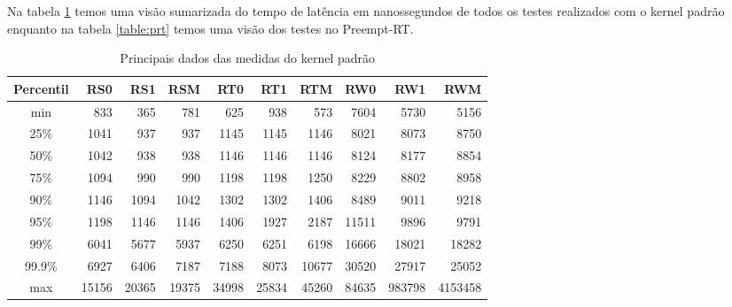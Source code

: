 Na tabela \ref{table:rpi} temos uma visão sumarizada do tempo de latência em nanossegundos de todos os testes realizados com o kernel padrão enquanto na tabela \ref{table:prt} temos uma visão dos testes no Preempt-RT.

\begin{table}[!htb]
\centering
\begin{center}
\begin{tabular}{|c|r|r|r|r|r|r|r|r|r|}
\toprule
Percentil &    RS0 &     RS1 &    RSM &    RT0 &    RT1 &    RTM &    RW0 &     RW1 &      RWM \\
\midrule
    min &    833 &    365 &    781 &    625 &    938 &    573 &   7604 &    5730 &     5156 \\
    25\% &   1041 &    937 &    937 &   1145 &   1145 &   1146 &   8021 &    8073 &     8750 \\
    50\% &   1042 &    938 &    938 &   1146 &   1146 &   1146 &   8124 &    8177 &     8854 \\
    75\% &   1094 &    990 &    990 &   1198 &   1198 &   1250 &   8229 &    8802 &     8958 \\
    90\% &   1146 &   1094 &   1042 &   1302 &   1302 &   1406 &   8489 &    9011 &     9218 \\
    95\% &   1198 &   1146 &   1146 &   1406 &   1927 &   2187 &  11511 &    9896 &     9791 \\
    99\% &   6041 &   5677 &   5937 &   6250 &   6251 &   6198 &  16666 &   18021 &    18282 \\
  99.9\% &   6927 &   6406 &   7187 &   7188 &   8073 &  10677 &  30520 &   27917 &    25052 \\
    max &  15156 &  20365 &  19375 &  34998 &  25834 &  45260 &  84635 &  983798 &  4153458 \\
\bottomrule
\end{tabular}
\end{center}
\caption{Principais dados das medidas do kernel padrão}
\label{table:rpi}
\end{table}

